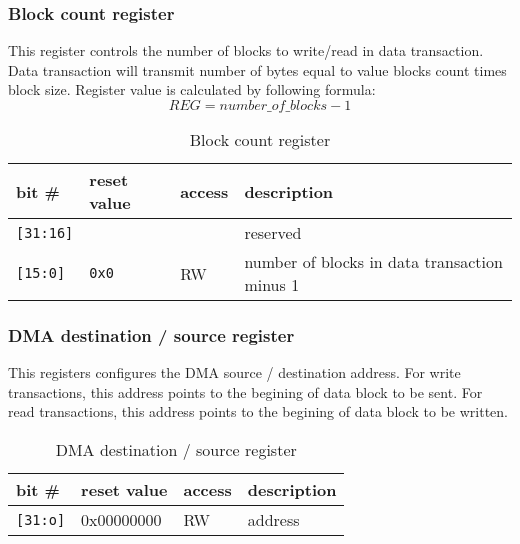     \subsubsection{Block count register}
    \label{sec:blockcnt_reg}
    
    This register controls the number of blocks to write/read in data transaction. Data transaction will transmit number of bytes equal to value blocks count times block size.
    Register value is calculated by following formula:
    \begin{equation}
    REG = number\_of\_blocks - 1
    \end{equation} 
    
    \begin{table}[H]
    \caption{Block count register}
        \begin{tabular}{m{1.3cm}|m{2cm}|m{1cm}|m{8cm}}
                \rowcolor[gray]{0.7} bit \# & reset value & access & description \\ \hline \hline
                \texttt{[31:16]} & & & reserved \\ \hline
                \texttt{[15:0]} & \texttt{0x0} & RW & number of blocks in data transaction minus 1 \\ \hline
                \hline
        \end{tabular}
        \label{tab:blockcnt_reg}
    \end{table}
    
    \subsubsection{DMA destination / source register}
    \label{sec:dst_src_reg}
    
    This registers configures the DMA source / destination address. For write transactions, this address points to the begining of data block to be sent.
    For read transactions, this address points to the begining of data block to be written.
    
    \begin{table}[H]
    \caption{DMA destination / source register}
        \begin{tabular}{m{1.3cm}|m{2cm}|m{1cm}|m{8cm}}
                \rowcolor[gray]{0.7} bit \# & reset value & access & description \\ \hline \hline
                \texttt{[31:o]} & 0x00000000 & RW & address \\ \hline
                \hline
        \end{tabular}
        \label{tab:dst_src_reg}
    \end{table}
    

